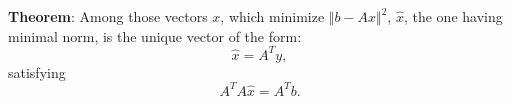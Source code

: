 \documentclass[aspectratio=169]{beamer}
\begin{document}
\begin{comment}

\begin{frame}{}  %
	
	{\color{violet} \textbf{Corollary}:}  $\Vert b - A x \Vert^2$ is minimized by $x_0$ if and only if $A x_0 = \hat{b}$ where $\hat{b}$ is the projection of $b$ on $\mathcal{R}(A)$.
	\vspace*{5mm}
		
	{\color{violet} \textbf{Corollary}:} There is always an $n-$dimensional vector $y$ such that
	\[ \Vert b - A A^T y\Vert^2 = \inf_ x \Vert b - A x \Vert^2,\]
	\noindent and if
	\[ \Vert b - A x_0 \Vert^2 = \inf_ x \Vert b - A x \Vert^2,\]
	\noindent then
	\[ \Vert x_0 \Vert^2 \geq \Vert A^T y\Vert^2\]
	with strict inequality unless $x_0 = A^T y$. The vector y satisfies the equation $A A^T y = \hat{b}$
\end{frame}

\end{comment}
\begin{frame}{} %
	
	{\color{violet} \textbf{Theorem}:} Among those vectors $x$, which minimize $\Vert b - A x\Vert^2$, $\hat{x}$, the one having minimal norm, is the unique vector of the form:
	\[\hat{x}= A^Ty,\]
	\noindent satisfying
	\[ A^T A \hat{x} = A^T b. \]
\end{frame}
\end{document}
